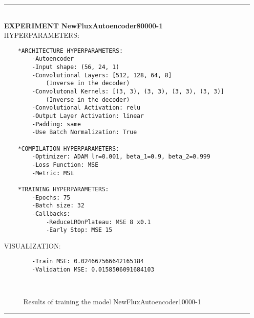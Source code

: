 \rule{0.5\textwidth}{0.5pt}\\

	{\large \textbf{EXPERIMENT NewFluxAutoencoder80000-1}}\\
	
	{\normalsize HYPERPARAMETERS:}
	\begin{lstlisting}
	*ARCHITECTURE HYPERPARAMETERS:
		-Autoencoder
		-Input shape: (56, 24, 1)
		-Convolutional Layers: [512, 128, 64, 8]
			(Inverse in the decoder)
		-Convolutonal Kernels: [(3, 3), (3, 3), (3, 3), (3, 3)] 
			(Inverse in the decoder)
		-Convolutional Activation: relu
		-Output Layer Activation: linear
		-Padding: same
		-Use Batch Normalization: True
	
	*COMPILATION HYPERPARAMETERS:
		-Optimizer: ADAM lr=0.001, beta_1=0.9, beta_2=0.999
		-Loss Function: MSE
		-Metric: MSE
	
	*TRAINING HYPERPARAMETERS:
		-Epochs: 75
		-Batch size: 32
		-Callbacks:
			-ReduceLROnPlateau: MSE 8 x0.1
			-Early Stop: MSE 15
	\end{lstlisting}
	
	{\normalsize VISUALIZATION:}
	\begin{lstlisting}
        -Train MSE: 0.024667566642165184
        -Validation MSE: 0.0158506091684103
	\end{lstlisting}
	
	\begin{figure*}[ht!]
		\hspace{\fill}
		\hspace{\fill}	
		\\
		\caption{Results of training the model NewFluxAutoencoder10000-1}
	\end{figure*}
	
\FloatBarrier	
\rule{0.5\textwidth}{0.5pt}\\